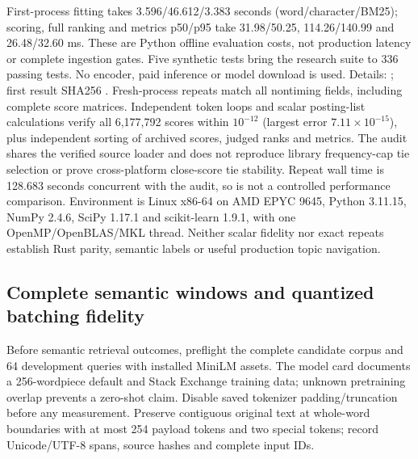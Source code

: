\documentclass[11pt]{article}
\begin{document}
First-process fitting takes 3.596/46.612/3.383 seconds (word/character/BM25);
scoring, full ranking and metrics p50/p95 take 31.98/50.25, 114.26/140.99 and
26.48/32.60 ms. These are Python offline evaluation costs, not production latency
or complete ingestion gates. Five synthetic tests bring the research suite to
336 passing tests. No encoder, paid inference or model download is used.
Details: ; first result
SHA256 .
Fresh-process repeats match all nontiming fields, including complete score
matrices. Independent token loops and scalar posting-list calculations verify
all 6,177,792 scores within $10^{-12}$ (largest error $7.11\times10^{-15}$),
plus independent sorting of archived scores, judged ranks and metrics.
The audit shares the verified source loader and does not reproduce library
frequency-cap tie selection or prove cross-platform close-score tie stability.
Repeat wall time is 128.683 seconds concurrent with the audit, so is not a
controlled performance comparison. Environment is Linux x86-64 on AMD EPYC
9645, Python 3.11.15, NumPy 2.4.6, SciPy 1.17.1 and scikit-learn 1.9.1,
with one OpenMP/OpenBLAS/MKL thread. Neither scalar fidelity nor exact repeats
establish Rust parity, semantic labels or useful production topic navigation.

\subsection{Complete semantic windows and quantized batching fidelity}
Before semantic retrieval outcomes, preflight the complete candidate corpus and
64 development queries with installed MiniLM assets. The model card documents
a 256-wordpiece default and Stack Exchange training data\cite{minilmcard};
unknown pretraining overlap prevents a zero-shot claim. Disable saved tokenizer
padding/truncation before any measurement. Preserve contiguous original text
at whole-word boundaries with at most 254 payload tokens and two special tokens;
record Unicode/UTF-8 spans, source hashes and complete input IDs.
\end{document}

